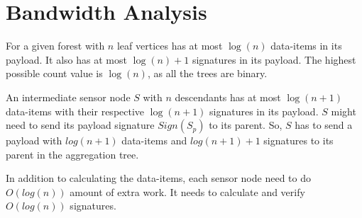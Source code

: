 	

\newpage
\section{Bandwidth Analysis}
	For a given forest with $n$ leaf vertices has at most $\log(n)$ data-items in its payload.
	It also has at most $\log(n)+1$ signatures in its payload.
	The highest possible count value is $\log(n)$, as all the trees are binary. 

	An intermediate sensor node $S$ with $n$ descendants has at most $\log(n+1)$ data-items with their respective $\log(n+1)$ signatures in its payload.
	$S$ might need to send its payload signature $Sign(S_{p})$ to its parent.
	So, $S$ has to send a payload with $log(n+1)$ data-items and $log(n+1) +1$ signatures to its parent in the aggregation tree. 

	In addition to calculating the data-items, each sensor node need to do $O(log(n))$ amount of extra work. It needs to calculate and verify $O(log(n))$ signatures. 
